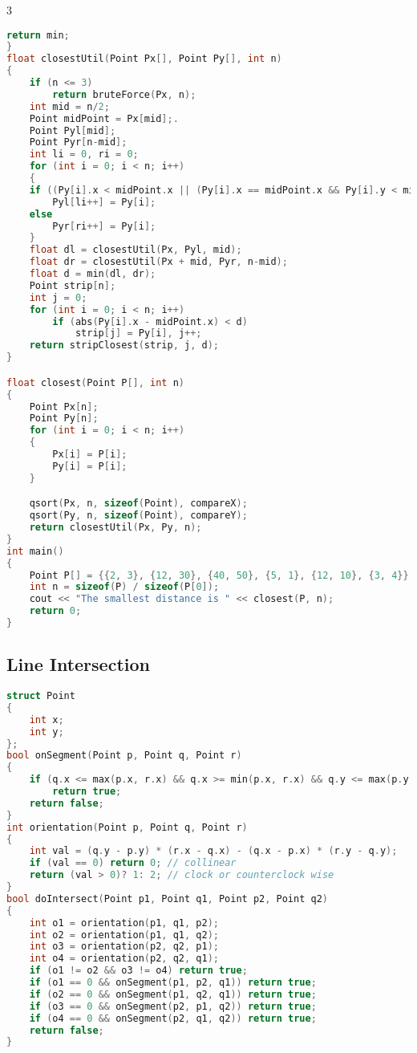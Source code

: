\documentclass[10pt,a4paper,landscape]{article}
\begin{document}
\begin{multicols}{3}
\begin{lstlisting}[language=C++, breaklines=true]
    return min;
}
float closestUtil(Point Px[], Point Py[], int n)
{
    if (n <= 3)
        return bruteForce(Px, n);
    int mid = n/2;
    Point midPoint = Px[mid];.
    Point Pyl[mid];
    Point Pyr[n-mid];
    int li = 0, ri = 0;
    for (int i = 0; i < n; i++)
    {
    if ((Py[i].x < midPoint.x || (Py[i].x == midPoint.x && Py[i].y < midPoint.y)) && li<mid)
        Pyl[li++] = Py[i];
    else
        Pyr[ri++] = Py[i];
    }
    float dl = closestUtil(Px, Pyl, mid);
    float dr = closestUtil(Px + mid, Pyr, n-mid);
    float d = min(dl, dr);
    Point strip[n];
    int j = 0;
    for (int i = 0; i < n; i++)
        if (abs(Py[i].x - midPoint.x) < d)
            strip[j] = Py[i], j++;
    return stripClosest(strip, j, d);
}

float closest(Point P[], int n)
{
    Point Px[n];
    Point Py[n];
    for (int i = 0; i < n; i++)
    {
        Px[i] = P[i];
        Py[i] = P[i];
    }

    qsort(Px, n, sizeof(Point), compareX);
    qsort(Py, n, sizeof(Point), compareY);
    return closestUtil(Px, Py, n);
}
int main()
{
    Point P[] = {{2, 3}, {12, 30}, {40, 50}, {5, 1}, {12, 10}, {3, 4}};
    int n = sizeof(P) / sizeof(P[0]);
    cout << "The smallest distance is " << closest(P, n);
    return 0;
}
\end{lstlisting}

\subsection{Line Intersection}
\begin{lstlisting}[language=C++, breaklines= true]
struct Point
{
    int x;
    int y;
};
bool onSegment(Point p, Point q, Point r)
{
    if (q.x <= max(p.x, r.x) && q.x >= min(p.x, r.x) && q.y <= max(p.y, r.y) && q.y >= min(p.y, r.y))
        return true;
    return false;
}
int orientation(Point p, Point q, Point r)
{
    int val = (q.y - p.y) * (r.x - q.x) - (q.x - p.x) * (r.y - q.y);
    if (val == 0) return 0; // collinear
    return (val > 0)? 1: 2; // clock or counterclock wise
}
bool doIntersect(Point p1, Point q1, Point p2, Point q2)
{
    int o1 = orientation(p1, q1, p2);
    int o2 = orientation(p1, q1, q2);
    int o3 = orientation(p2, q2, p1);
    int o4 = orientation(p2, q2, q1);
    if (o1 != o2 && o3 != o4) return true;
    if (o1 == 0 && onSegment(p1, p2, q1)) return true;
    if (o2 == 0 && onSegment(p1, q2, q1)) return true;
    if (o3 == 0 && onSegment(p2, p1, q2)) return true;
    if (o4 == 0 && onSegment(p2, q1, q2)) return true;
    return false;
}
\end{lstlisting}


\end{multicols}
\end{document}
